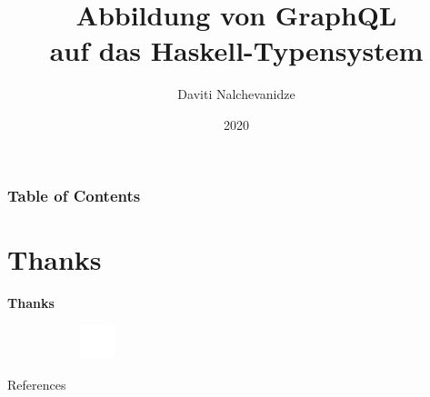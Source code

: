 \documentclass[aspectratio=169,t,xcolor=table]{beamer}
\begin{document}
\title[Inf UFG]{Abbildung von GraphQL \\ auf das Haskell-Typensystem}

\author{Daviti Nalchevanidze}

\date{2020}
\frame[noframenumbering]{\titlepage}



\begin{frame}
    \frametitle{Table of Contents}
    \tableofcontents
\end{frame}






\section{Thanks}
\begin{frame}
    
    \centering
    \vspace{2cm}
    
    \textbf{\Huge Thanks}
    
    
    
    
    \vspace{2cm}
    \begin{figure}
        \centering
        \begin{subfigure}{0.2\textwidth}
            \centering
            \includegraphics[height=1cm]{assets/img/logo-white-outline.pdf}
        \end{subfigure}%
    \end{figure}
\end{frame}


\nocite{*}
\begin{frame}{References}
    \printbibliography
\end{frame}

\appendix


\titlepage
\end{document}
